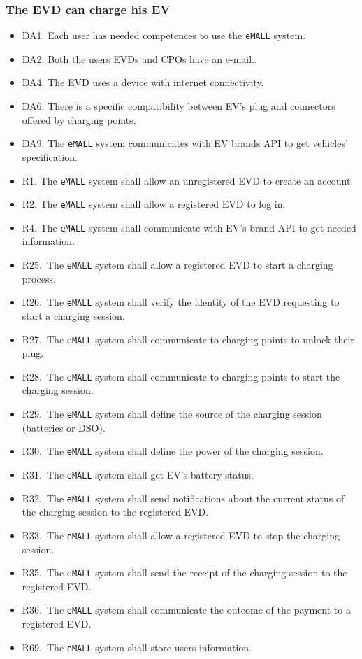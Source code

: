 \subsubsection{The EVD can charge his EV}
\begin{itemize}
    \item DA1. Each user has needed competences to use the \verb|eMALL| system.
    \item DA2. Both the users EVDs and CPOs have an e-mail..
    \item DA4. The EVD uses a device with internet connectivity.
    \item DA6. There is a specific compatibility between EV’s plug and connectors offered by
    charging points.
    \item DA9. The \verb|eMALL| system communicates with EV brands API to get vehicles’ specification.
    \item R1. The \verb|eMALL| system shall allow an unregistered EVD to create an account.
    \item R2. The \verb|eMALL| system shall allow a registered EVD to log in.
    \item R4. The \verb|eMALL| system shall communicate with EV’s brand API to get needed information.
    \item R25.\ The \verb|eMALL| system shall allow a registered EVD to start a charging process.
    \item R26.\ The \verb|eMALL| system shall verify the identity of the EVD requesting to start a
    charging session.
    \item R27.\ The \verb|eMALL| system shall communicate to charging points to unlock their plug.
    \item R28.\ The \verb|eMALL| system shall communicate to charging points to start the charging
    session.
    \item R29.\ The \verb|eMALL| system shall define the source of the charging session (batteries or
    DSO).
    \item R30.\ The \verb|eMALL| system shall define the power of the charging session.
    \item R31.\ The \verb|eMALL| system shall get EV’s battery status.
    \item R32.\ The \verb|eMALL| system shall send notifications about the current status of the charging
    session to the registered EVD\@.
    \item R33.\ The \verb|eMALL| system shall allow a registered EVD to stop the charging session.
    \item R35.\ The \verb|eMALL| system shall send the receipt of the charging session to the registered
    EVD\@.
    \item R36.\ The \verb|eMALL| system shall communicate the outcome of the payment to a registered
    EVD\@.
    \item R69.\ The \verb|eMALL| system shall store users information.
\end{itemize}

